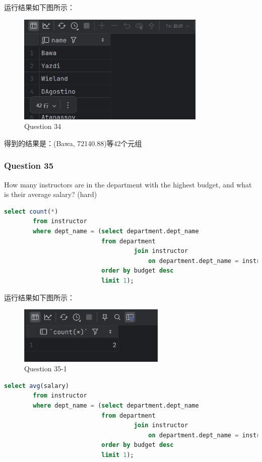 \documentclass{article}
\begin{document}
    运行结果如下图所示：
    
    \begin{figure}[H]
    	\centering
    	\includegraphics[width=9cm]{./images/38.Question34.png}
    	\caption{Question 34}
    \end{figure}
    
    得到的结果是：(Bawa, 72140.88)等42个元组
    
    \subsubsection{Question 35}
    
    How many instructors are in the department with the highest budget, and what is their average salary?  (hard)
    
    \begin{lstlisting}[language=sql, title=Question 35-1, tabsize=4]
    	select count(*)
    	from instructor
    	where dept_name = (select department.dept_name
    					   from department
    								join instructor
    									on department.dept_name = instructor.dept_name
    					   order by budget desc
    					   limit 1);
    \end{lstlisting}
    
    运行结果如下图所示：
    
    \begin{figure}[H]
    	\centering
    	\includegraphics[width=7cm]{./images/39.Question35-1.png}
    	\caption{Question 35-1}
    \end{figure}
    
    \begin{lstlisting}[language=sql, title=Question 35-2, tabsize=4]
    	select avg(salary)
    	from instructor
    	where dept_name = (select department.dept_name
    					   from department
    								join instructor
    									on department.dept_name = instructor.dept_name
    					   order by budget desc
    					   limit 1);
    \end{lstlisting}
    
\end{document}
